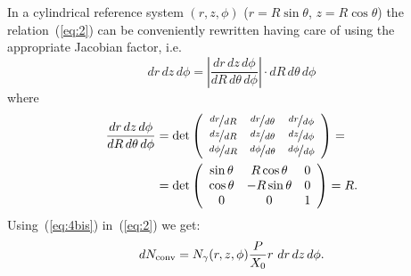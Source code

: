 In a cylindrical reference system $(r,z,\phi)$ ($r=R\sin\theta$, $z=R\cos\theta$) the relation~(\ref{eq:2}) can be
conveniently rewritten having care of using the appropriate Jacobian
factor, i.e.
\begin{equation}
 dr\,dz\,d\phi = \left| \frac{dr\, dz\, d\phi}{dR\,d\theta\,d\phi}
   \right| \cdot dR\,d\theta\,d\phi
\label{eq:3bis}
\end{equation}
where
\begin{equation}
\begin{split}
\frac{dr\,dz\,d\phi}{dR\,d\theta\, d\phi}
& = \det \left( \begin{array}{ccc}
\nicefrac{dr}{dR}      & \nicefrac{dr}{d\theta}      & \nicefrac{dr}{d\phi} \\
\nicefrac{dz}{dR}      & \nicefrac{dz}{d\theta}      & \nicefrac{dz}{d\phi} \\
\nicefrac{d\phi}{dR}   & \nicefrac{d\phi}{d\theta}   & \nicefrac{d\phi}{d\phi}
\end{array} \right) = \\
& = \det \left( \begin{array}{ccc}
\sin \theta & R\cos\theta  & 0\\
\cos\theta  & -R\sin\theta & 0 \\
 0 & 0 & 1 
\end{array} \right)
= R .
\end{split}
\label{eq:4bis}
\end{equation}
Using~(\ref{eq:4bis}) in~(\ref{eq:2}) we get:
\begin{equation}
dN_{\rm conv} = N_{\gamma}(r, z, \phi) 
\frac{P}{X_0} r\, \,dr\,dz\,d\phi .
\label{eq:5bis}
\end{equation}

